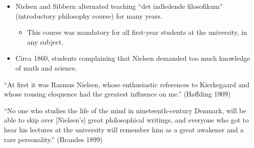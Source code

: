 \documentclass[ignorenonframetext, ]{beamer}
\begin{document}
\begin{frame}

\begin{itemize}
\item Nielsen and Sibbern alternated teaching ``det indledende
  filosofikum'' (introductory philosophy course) for many years.
  \begin{itemize}
  \item This course was mandatory for all first-year students at the
    university, in any subject.
  \end{itemize}
\item Circa 1860, students complaining that Nielsen demanded too much
  knowledge of math and science.
\end{itemize}
\end{frame}

\begin{frame}

``At first it was Rasmus Nielsen, whose enthusiastic references to
  Kierkegaard and whose rousing eloquence had the greatest influence
  on me.'' (Høffding 1909)

  \vfill

  ``No one who studies the life of the mind in nineteenth-century
  Denmark, will be able to skip over [Nielsen's] great philosophical
  writings, and everyone who got to hear his lectures at the
  university will remember him as a great awakener and a rare
  personality.'' (Brandes 1899)
  
\end{frame}
\end{document}
